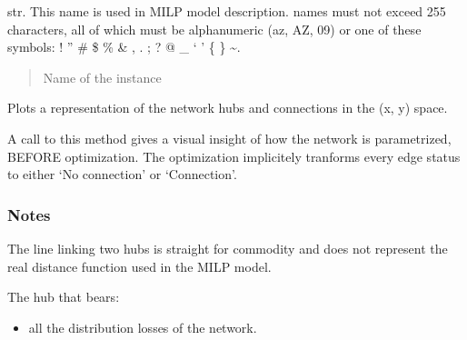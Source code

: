 \documentclass[letterpaper,10pt,english]{sphinxmanual}
\begin{document}
\begin{fulllineitems}
\begin{fulllineitems}
\label{\detokenize{generated/tamos.network.ThermalNetwork:tamos.network.ThermalNetwork.name}}
\pysigstartsignatures
{}
\pysigstopsignatures
\sphinxAtStartPar
str.
This name is used in MILP model description.
names must not exceed 255 characters,
all of which must be alphanumeric (a\sphinxhyphen{}z, A\sphinxhyphen{}Z, 0\sphinxhyphen{}9) or one of these symbols:
! ” \# \$ \% \& , . ; ? @ \_ ‘ ’ \{ \} \textasciitilde{}.
\begin{quote}\begin{description}
\sphinxAtStartPar
Name of the instance

\end{description}\end{quote}

\end{fulllineitems}


\begin{fulllineitems}
\label{\detokenize{generated/tamos.network.ThermalNetwork:tamos.network.ThermalNetwork.plot}}
\pysigstartsignatures
{}
\pysigstopsignatures
\sphinxAtStartPar
Plots a representation of the network hubs and connections in the (x, y) space.

\sphinxAtStartPar
A call to this method gives a visual insight of how the network is parametrized, BEFORE optimization.
The optimization implicitely tranforms every edge status to either ‘No connection’ or ‘Connection’.
\subsubsection*{Notes}

\sphinxAtStartPar
The line linking two hubs is straight for commodity and does not represent
the real distance function used in the MILP model.

\end{fulllineitems}


\begin{fulllineitems}
\label{\detokenize{generated/tamos.network.ThermalNetwork:tamos.network.ThermalNetwork.production_hub}}
\pysigstartsignatures
{}
\pysigstopsignatures
\sphinxAtStartPar
The hub that bears:
\begin{itemize}
\item {} 
\sphinxAtStartPar
all the distribution losses of the network.


\end{itemize}
\end{fulllineitems}
\end{fulllineitems}
\end{document}

